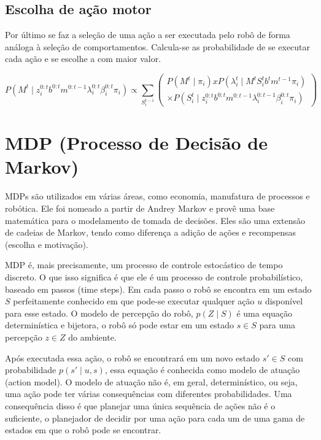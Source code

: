 \subsection{Escolha de ação motor}

Por último se faz a seleção de uma ação a ser executada pelo robô de forma análoga à seleção de comportamentos. Calcula-se as probabilidade de se executar cada ação  e se escolhe a com maior valor.

\begin{equation}
    P \left( M^t \mid z_i^{0: t} b^{0: t} m^{0: t-1} \lambda_i^{0: t} \beta_i^{0: t} \pi_i \right) \propto \sum\limits_{S_i^{t-1}}
        \left(
            \begin{array}{l}
                P \left( M^t \mid \pi_i \right) x   P \left( \lambda_i^t \mid M^t S_i^t b^t m^{t-1} \pi_i \right)\\
                \times P \left( S_i^t \mid z_i^{0: t} b^{0: t} m^{0: t-1} \lambda_i^{0: t-1} \beta_i^{0: t} \pi_i \right)
            \end{array}
        \right)
\end{equation}


\section{MDP (Processo de Decisão de Markov)} \label{section:SecaoMDP}

MDPs são utilizados em várias áreas, como economia, manufatura de processos e robótica. Ele foi nomeado a partir de Andrey Markov e provê uma base matemática para o modelamento de tomada de decisões. Eles são uma extensão de cadeias de Markov, tendo como diferença a adição de ações e recompensas (escolha e motivação).

MDP é, mais precisamente, um processo de controle estocástico de tempo discreto. O que isso significa é que ele é um processo de controle probabilístico, baseado em passos (time steps). Em cada passo o robô se encontra em um estado $ S $ perfeitamente conhecido em que pode-se executar qualquer ação $ u $ disponível para esse estado. O modelo de percepção do robô, $ p \left( Z \mid S \right) $ é uma equação determinística e bijetora, o robô só pode estar em um estado $ s \in S $ para uma percepção $ z \in Z $ do ambiente.

Após executada essa ação, o robô se encontrará em um novo estado $ s' \in S $ com probabilidade $ p \left( s' \mid u, s \right) $, essa equação é conhecida como modelo de atuação (action model). O modelo de atuação não é, em geral, determinístico, ou seja, uma ação pode ter várias consequências com diferentes probabilidades. Uma consequência disso é que planejar uma única sequência de ações não é o suficiente, o planejador de decidir por uma ação para cada um de uma gama de estados em que o robô pode se encontrar.

